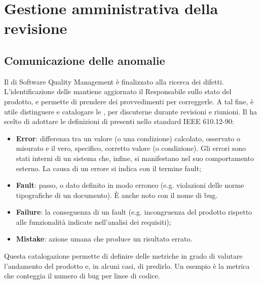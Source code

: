 \section{Gestione amministrativa della revisione}
\subsection{Comunicazione delle anomalie}
Il  di Software Quality Management è finalizzato alla ricerca dei difetti. L'identificazione delle  mantiene aggiornato il Responsabile sullo stato del prodotto, e permette di prendere dei provvedimenti per correggerle. A tal fine, è utile distinguere e catalogare le , per discuterne durante revisioni e riunioni. Il  ha scelto di adottare le definizioni di  presenti nello standard IEEE 610.12-90:
\begin{itemize}
\item \textbf{Error}: differenza tra un valore (o una condizione) calcolato, osservato o misurato e il vero, specifico, corretto valore (o condizione). Gli errori sono stati interni di un sistema che, infine, si manifestano nel suo comportamento esterno. La causa di un errore si indica con il termine fault;
\item \textbf{Fault}: passo,  o dato definito in modo erroneo (e.g. violazioni delle norme tipografiche di un documento). \`E anche noto con il nome di bug.
\item \textbf{Failure}: la conseguenza di un fault (e.g. incongruenza del prodotto rispetto alle funzionalità indicate nell'analisi dei requisiti);
\item \textbf{Mistake}: azione umana che produce un risultato errato.
\end{itemize}
Questa catalogazione permette di definire delle metriche in grado di valutare l'andamento del prodotto e, in alcuni casi, di predirlo. Un esempio è la metrica che conteggia il numero di bug per linee di codice.

